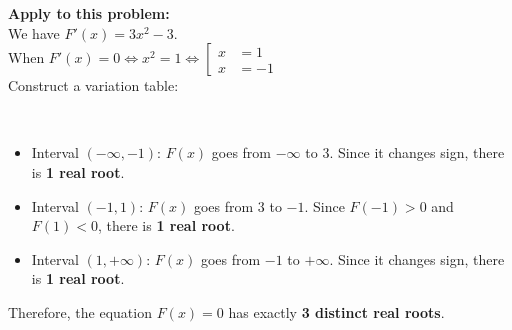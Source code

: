 \textbf{Apply to this problem:} \\
We have $F'(x) = 3x^2 - 3$. \\
When $F'(x) = 0 \Leftrightarrow x^2 = 1 \Leftrightarrow
\left[ \begin{aligned}
    x &= 1 \\
    x &= -1
\end{aligned} \right.$ \\
Construct a variation table: \\
\begin{center}
 \\
\end{center}
\begin{itemize}
    \item Interval $(-\infty, -1)$: $F(x)$ goes from $-\infty$ to $3$. Since it changes sign, there is \textbf{1 real root}.
    \item Interval $(-1, 1)$: $F(x)$ goes from $3$ to $-1$. Since $F(-1) > 0$ and $F(1) < 0$, there is \textbf{1 real root}.
    \item Interval $(1, +\infty)$: $F(x)$ goes from $-1$ to $+\infty$. Since it changes sign, there is \textbf{1 real root}.
\end{itemize}
Therefore, the equation $F(x)=0$ has exactly \textbf{3 distinct real roots}.
\pagebreak